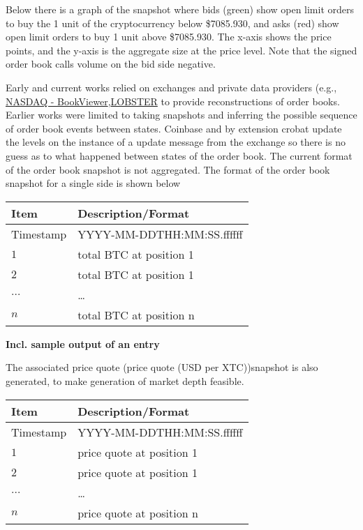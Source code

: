 Below there is a graph of the snapshot where bids (green) show open limit orders to buy the 1 unit of the cryptocurrency below \$7085.930, and asks (red) show open limit orders to buy 1 unit above \$7085.930. The x-axis shows the price points, and the y-axis is the aggregate size at the price level. Note that  the signed order book calls volume on the bid side negative. 


Early and current works relied on exchanges and private data providers (e.g., \href{https://data.nasdaq.com/BookViewer.aspx}{NASDAQ - BookViewer},\href{https://lobsterdata.com/}{LOBSTER} to provide reconstructions of order books. Earlier works were limited to taking snapshots and inferring the possible sequence of order book events between states. Coinbase and by extension crobat update the levels on the instance of a update message from the exchange so there is no guess as to what happened between states of the order book. The current format of the order book snapshot is not aggregated. The format of the order book snapshot for a single side is shown below

\begin{center}
	\begin{tabular}{|l|l|}
		\hline
		Item & Description/Format \\
		\hline
		Timestamp & YYYY-MM-DDTHH:MM:SS.ffffff\\ $1$ & total BTC at position 1 \\
		$2$ &total BTC at position 1 \\
		$\ldots$ & \ldots \\
		$n$ & total BTC at position n \\
		\hline
	\end{tabular}
\end{center}

\textbf{Incl. sample output of an entry}

The associated price quote (price quote (USD per XTC))snapshot is also generated, to make generation of market depth feasible. 

\begin{center}
	\begin{tabular}{|l|l|}
		\hline
		Item & Description/Format \\
		\hline
		Timestamp & YYYY-MM-DDTHH:MM:SS.ffffff\\ 
		$1$ & price quote at position 1 \\
		$2$ &price quote at position 1 \\
		$\ldots$ & \ldots \\
		$n$ & price quote at position n \\
		\hline
	\end{tabular}
\end{center}


